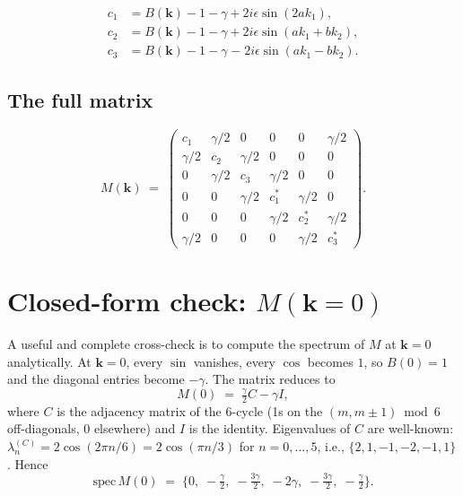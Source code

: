 \documentclass[11pt,a4paper]{article}
\newcommand{\nn}{\nonumber \\}
\newcommand{\vk}{\mathbf{k}}
\begin{document}
\begin{correctbox}
\begin{align}\label{eq:c_final}
c_1 &= B(\vk) - 1 - \gamma + 2 i \epsilon \sin(2 a k_1), \nn
c_2 &= B(\vk) - 1 - \gamma + 2 i \epsilon \sin(a k_1 + b k_2), \nn
c_3 &= B(\vk) - 1 - \gamma \;\mathbf{-}\; 2 i \epsilon \sin(a k_1 - b k_2).
\end{align}
\end{correctbox}

\subsection{The full matrix}\label{ssec:Mk_full}

\begin{equation}\label{eq:Mk_explicit}
M(\vk) \;=\;
\begin{pmatrix}
c_1 & \gamma/2 & 0 & 0 & 0 & \gamma/2 \\
\gamma/2 & c_2 & \gamma/2 & 0 & 0 & 0 \\
0 & \gamma/2 & c_3 & \gamma/2 & 0 & 0 \\
0 & 0 & \gamma/2 & c_1^* & \gamma/2 & 0 \\
0 & 0 & 0 & \gamma/2 & c_2^* & \gamma/2 \\
\gamma/2 & 0 & 0 & 0 & \gamma/2 & c_3^*
\end{pmatrix}.
\end{equation}

\section{Closed-form check: $M(\vk = 0)$}\label{sec:k0-check}

A useful and complete cross-check is to compute the spectrum of $M$ at
$\vk = 0$ analytically. At $\vk = 0$, every $\sin$ vanishes, every
$\cos$ becomes $1$, so $B(0) = 1$ and the diagonal entries become
$-\gamma$. The matrix reduces to
\begin{equation}\label{eq:M_zero}
M(0) \;=\; \tfrac{\gamma}{2} C - \gamma I,
\end{equation}
where $C$ is the adjacency matrix of the 6-cycle (1s on the
$(m, m\pm 1) \bmod 6$ off-diagonals, 0 elsewhere) and $I$ is the
identity. Eigenvalues of $C$ are well-known:
$\lambda_n^{(C)} = 2\cos(2\pi n / 6) = 2\cos(\pi n/3)$ for $n = 0,\ldots,5$, i.e.,
$\{2, 1, -1, -2, -1, 1\}$. Hence
\begin{equation}\label{eq:M0_spectrum}
\boxed{\;\;\mathrm{spec}\,M(0) \;=\; \big\{0,\; -\tfrac{\gamma}{2},\; -\tfrac{3\gamma}{2},\; -2\gamma,\; -\tfrac{3\gamma}{2},\; -\tfrac{\gamma}{2}\big\}.\;\;}
\end{equation}
\end{document}
